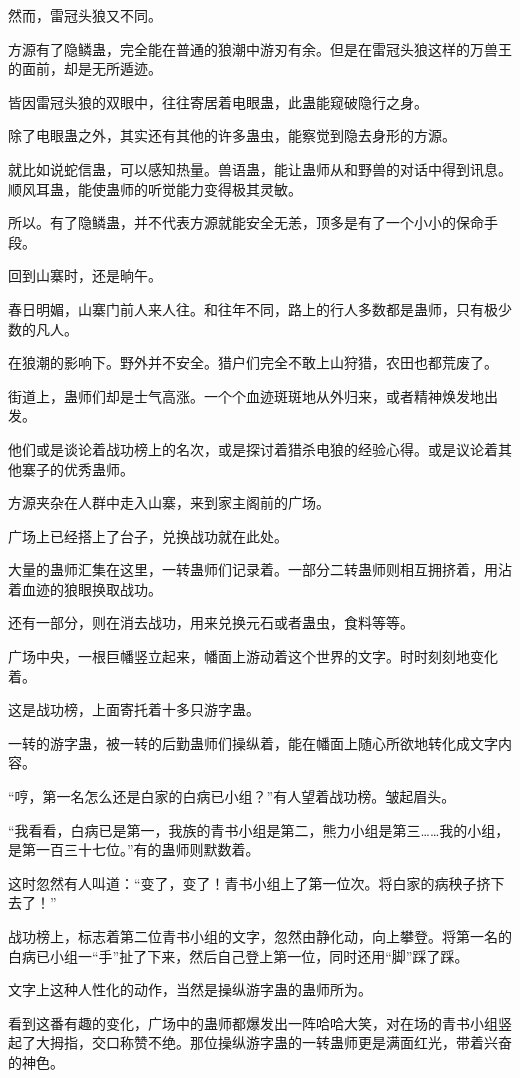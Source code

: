\begin{this_body}
然而，雷冠头狼又不同。

方源有了隐鳞蛊，完全能在普通的狼潮中游刃有余。但是在雷冠头狼这样的万兽王的面前，却是无所遁迹。

皆因雷冠头狼的双眼中，往往寄居着电眼蛊，此蛊能窥破隐行之身。

除了电眼蛊之外，其实还有其他的许多蛊虫，能察觉到隐去身形的方源。

就比如说蛇信蛊，可以感知热量。兽语蛊，能让蛊师从和野兽的对话中得到讯息。顺风耳蛊，能使蛊师的听觉能力变得极其灵敏。

所以。有了隐鳞蛊，并不代表方源就能安全无恙，顶多是有了一个小小的保命手段。

回到山寨时，还是晌午。

春日明媚，山寨门前人来人往。和往年不同，路上的行人多数都是蛊师，只有极少数的凡人。

在狼潮的影响下。野外并不安全。猎户们完全不敢上山狩猎，农田也都荒废了。

街道上，蛊师们却是士气高涨。一个个血迹斑斑地从外归来，或者精神焕发地出发。

他们或是谈论着战功榜上的名次，或是探讨着猎杀电狼的经验心得。或是议论着其他寨子的优秀蛊师。

方源夹杂在人群中走入山寨，来到家主阁前的广场。

广场上已经搭上了台子，兑换战功就在此处。

大量的蛊师汇集在这里，一转蛊师们记录着。一部分二转蛊师则相互拥挤着，用沾着血迹的狼眼换取战功。

还有一部分，则在消去战功，用来兑换元石或者蛊虫，食料等等。

广场中央，一根巨幡竖立起来，幡面上游动着这个世界的文字。时时刻刻地变化着。

这是战功榜，上面寄托着十多只游字蛊。

一转的游字蛊，被一转的后勤蛊师们操纵着，能在幡面上随心所欲地转化成文字内容。

“哼，第一名怎么还是白家的白病已小组？”有人望着战功榜。皱起眉头。

“我看看，白病已是第一，我族的青书小组是第二，熊力小组是第三……我的小组，是第一百三十七位。”有的蛊师则默数着。

这时忽然有人叫道：“变了，变了！青书小组上了第一位次。将白家的病秧子挤下去了！”

战功榜上，标志着第二位青书小组的文字，忽然由静化动，向上攀登。将第一名的白病已小组一“手”扯了下来，然后自己登上第一位，同时还用“脚”踩了踩。

文字上这种人性化的动作，当然是操纵游字蛊的蛊师所为。

看到这番有趣的变化，广场中的蛊师都爆发出一阵哈哈大笑，对在场的青书小组竖起了大拇指，交口称赞不绝。那位操纵游字蛊的一转蛊师更是满面红光，带着兴奋的神色。


\end{this_body}
